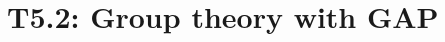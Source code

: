 \documentclass{beamer}
\begin{document}
      


\section{T5.2: Group theory with GAP}
\end{document}
